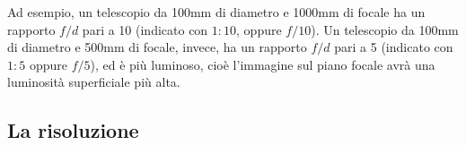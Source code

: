 Ad esempio, un telescopio da 100\unit{mm} di diametro e 1000\unit{mm} di focale ha un rapporto $f/d$ pari a 10 (indicato con
$1:10$, oppure $f/10$). Un telescopio da 100\unit{mm} di diametro e 500\unit{mm} di focale, invece, ha un rapporto
$f/d$  pari a 5 (indicato con $1:5$ oppure $f/5$), ed è più luminoso, cioè l'immagine sul piano focale avrà
una luminosità superficiale più alta.

\subsection{La risoluzione}